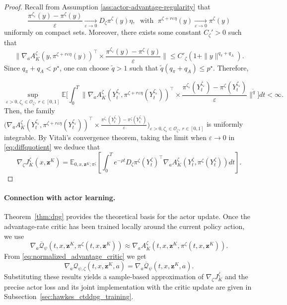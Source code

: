 \documentclass[11pt]{article}
\theoremstyle{remarkitalic}
\theoremstyle{remarkitalic}
\newcommand{\1}{\mathbf 1}
\begin{document}
\begin{proof}
Recall from Assumption \ref{ass:actor-advantage-regularity} that
\[
\frac{
\pi^{\zeta_\varepsilon}(y)-\pi^\zeta(y)
}{\varepsilon}
\underset{\varepsilon\to 0}{\longrightarrow}
D_\zeta\pi^\zeta(y)\eta,\; \text{ with }\; \pi^{\zeta+r\varepsilon\eta}(y)
\underset{\varepsilon\to 0}{\longrightarrow}
\pi^\zeta(y)
\]
uniformly on compact sets. Moreover,
there exists some constant $C_\zeta'>0$ such that
\[\|\nabla_aA^\zeta_K
\!\left(
y,
\pi^{\zeta+r\varepsilon\eta}
(y)
\right)^\top\times
\frac{
\pi^{\zeta_\varepsilon}(y)
-
\pi^\zeta(y)
}{\varepsilon}\| \leq C'_\zeta(1+\|y\|^{q_\pi+q_A}).\]
Since $q_\pi+q_A<p^\star$, one can choose $\tilde q>1$ such that $\tilde q(q_\pi+q_A)\leq p^\star$. Therefore,

\[\sup_{\varepsilon>0, \zeta_\varepsilon\in \mathcal O_\zeta,\; r\in [0,1]} \mathbb E\Big[ \int_0^T \|\nabla_aA^\zeta_K
\!\left(
Y_t^{\zeta_\varepsilon},
\pi^{\zeta+r\varepsilon\eta}
(Y_t^{\zeta_\varepsilon})
\right)^\top\times
\frac{
\pi^{\zeta_\varepsilon}(Y_t^{\zeta_\varepsilon})
-
\pi^\zeta(Y_t^{\zeta_\varepsilon})
}{\varepsilon}\|^{\tilde q}\Big]dt<\infty.\]
Then, the family $\Big(\nabla_aA^\zeta_K
\!\left(
Y_t^{\zeta_\varepsilon},
\pi^{\zeta+r\varepsilon\eta}
(Y_t^{\zeta_\varepsilon})
\right)^\top\times
\frac{
\pi^{\zeta_\varepsilon}(Y_t^{\zeta_\varepsilon})
-
\pi^\zeta(Y_t^{\zeta_\varepsilon})
}{\varepsilon}\Big)_{\varepsilon>0, \zeta_\varepsilon\in \mathcal O_\zeta,\; r\in [0,1]}$ is uniformly integrable. 
By Vitali's convergence theorem, taking the limit when $\varepsilon\longrightarrow 0$ in  \eqref{eq:diffquotient} we deduce that \[
\nabla_{\zeta}J_K^{\zeta}(x,\mathbf{z}^K)
=
\mathbb{E}_{0,x,\mathbf{z}^K;\pi^{\zeta}}
\left[
    \int_0^T
    e^{-\rho t}
    D_{\zeta}\pi^{\zeta}(Y_t^{\zeta})^{\top}
    \nabla_a A_K^{\zeta}
    \left(
        Y_t^{\zeta},
        \pi^{\zeta}(Y_t^{\zeta})
    \right)
    dt
\right].
\]
\end{proof}

\paragraph{Connection with actor learning.}

Theorem~\ref{thm:dpg} provides the theoretical basis for the actor
update. Once the advantage-rate critic has been trained locally around
the current policy action, we use
\[
    \nabla_a\overline {\mathcal Q}_\psi
    \left(
        t,x,\mathbf z^K,
        \pi^\zeta(t,x,\mathbf z^K)
    \right)
    \approx
    \nabla_a A_K^\zeta
    \left(
        t,x,\mathbf z^K,
        \pi^\zeta(t,x,\mathbf z^K)
    \right).
\]
From
\eqref{eq:normalized_advantage_critic} we get
\[
    \nabla_a {\mathcal Q}_{\psi,\zeta}(t,x,\mathbf z^K,a)
    =
    \nabla_a\overline {\mathcal Q}_\psi(t,x,\mathbf z^K,a).
\]
Substituting these results yields a sample-based approximation of
$\nabla_\zeta J_K^\zeta$ and the precise actor loss and its joint
implementation with the critic update are given in
Subsection~\ref{sec:hawkes_ctddpg_training}.
\end{document}
